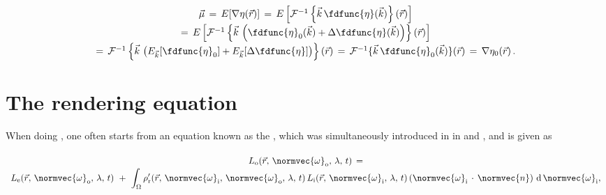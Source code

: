 {\begin{equation}
\renewcommand*{\arraystretch}{1.5}
\begin{array}{c}
\vec{\mu} \,=\, E[\nabla\eta(\vec{r})] \,=\, E\left[\mathcal{F}^{-1}\left\{\vec{k}\,\fdfunc{\eta}(\vec{k})\right\}(\vec{r})\right] \\
=\, E\left[\mathcal{F}^{-1}\left\{\vec{k}\,\left(\fdfunc{\eta}_0(\vec{k})+\Delta\fdfunc{\eta}(\vec{k})\right)\right\}(\vec{r})\right] \\
=\, \mathcal{F}^{-1}\left\{\vec{k}\,\left(E_{\vec{k}}[\fdfunc{\eta}_0]+E_{\vec{k}}[\Delta\fdfunc{\eta}]\right)\right\}(\vec{r}) \,=\, \mathcal{F}^{-1}\{\vec{k}\,\fdfunc{\eta}_0(\vec{k})\}(\vec{r}) \,=\, \nabla\eta_0(\vec{r})\,.
\end{array}
\end{equation}

\HRule





















\section{The rendering equation}

When doing , one often starts from an equation known as the , which was simultaneously introduced in  in \citep{temp} and \citep{temp}, and is given as

\begin{equation} \label{eq:rendering_equation_original}
\begin{array}{c}
L_{\text{o}}(\vec{r},\,\normvec{\omega}_{\text{o}},\, \lambda,\, t) \,= \\
\displaystyle L_{\text{e}}(\vec{r},\, \normvec{\omega}_{\text{o}},\, \lambda,\, t) \ + \ \int_\Omega \rho'_{\text{r}}(\vec{r},\, \normvec{\omega}_{\text{i}},\, \normvec{\omega}_{\text{o}},\, \lambda,\, t)\, L_{\text{i}}(\vec{r},\, \normvec{\omega}_{\text{i}},\, \lambda,\, t)\, (\normvec{\omega}_{\text{i}}\,\cdot\,\normvec{n})\, \operatorname d \normvec{\omega}_{\text{i}},
\end{array}
\end{equation}

}
